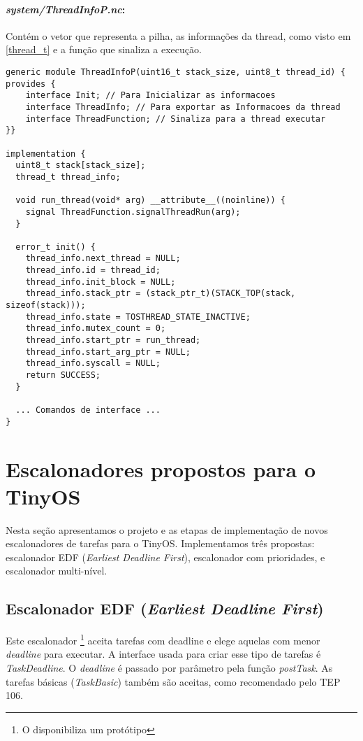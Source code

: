 \documentclass[a4paper,onecolumn, 10pt]{article}
\begin{document}
\paragraph{\textit{system/ThreadInfoP.nc}:} Contém o vetor que representa a pilha, as informações da thread,
como visto em \ref{thread_t} e a função que sinaliza a execução.
\begin{lstlisting}
generic module ThreadInfoP(uint16_t stack_size, uint8_t thread_id) { 
provides {
    interface Init; // Para Inicializar as informacoes
    interface ThreadInfo; // Para exportar as Informacoes da thread
    interface ThreadFunction; // Sinaliza para a thread executar 
}}

implementation {
  uint8_t stack[stack_size];
  thread_t thread_info;

  void run_thread(void* arg) __attribute__((noinline)) {
    signal ThreadFunction.signalThreadRun(arg);
  }
  
  error_t init() {
    thread_info.next_thread = NULL;
    thread_info.id = thread_id;
    thread_info.init_block = NULL;
    thread_info.stack_ptr = (stack_ptr_t)(STACK_TOP(stack, sizeof(stack)));
    thread_info.state = TOSTHREAD_STATE_INACTIVE;
    thread_info.mutex_count = 0;
    thread_info.start_ptr = run_thread;
    thread_info.start_arg_ptr = NULL;
    thread_info.syscall = NULL;
    return SUCCESS;
  }

  ... Comandos de interface ...
}
\end{lstlisting}

\section{Escalonadores propostos para o TinyOS}\label{escalonadorespropostos}
Nesta seção apresentamos o projeto e as etapas de implementação de novos escalonadores
de tarefas para o TinyOS.
Implementamos três propostas: escalonador EDF (\textit{Earliest Deadline First}), escalonador com prioridades,  
e escalonador multi-nível.

\subsection{Escalonador EDF (\textit{Earliest Deadline First})}\label{escalonadoredf}
Este escalonador \footnote{O \cite{TEP106} disponibiliza um protótipo} aceita tarefas com deadline e 
elege aquelas com menor \textit{deadline} para executar. A interface usada para criar
esse tipo de tarefas é \textit{TaskDeadline}. O \textit{deadline} é passado por parâmetro pela função \textit{postTask}.
As tarefas básicas (\textit{TaskBasic}) também são aceitas, como recomendado pelo TEP 106\cite{TEP106}.
\end{document}
